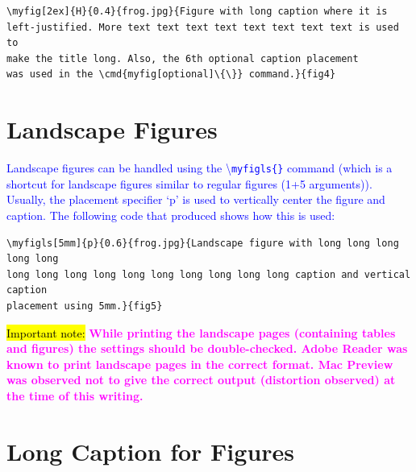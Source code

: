 \documentclass[phd,showframe]{ndsu-thesis-2022}
\newcommand\italk[1]{\textcolor{blue}{#1}}  %
\newcommand\cmd[1]{\textbackslash\texttt{#1}}  %
\begin{document}
{\singlespacing
\begin{verbatim}
\myfig[2ex]{H}{0.4}{frog.jpg}{Figure with long caption where it is 
left-justified. More text text text text text text text text is used to 
make the title long. Also, the 6th optional caption placement 
was used in the \cmd{myfig[optional]\{\}} command.}{fig4}
\end{verbatim}
}



\section{Landscape Figures}

\italk{Landscape figures can be handled using the \cmd{myfigls\{\}} command (which is a shortcut for landscape figures similar to regular figures (1+5 arguments)). Usually, the placement specifier `p' is used to vertically center the figure and caption. The following code that produced \Cref{fig5} shows how this is used:}

\vspace{-4ex}
{\singlespace
\begin{verbatim}
\myfigls[5mm]{p}{0.6}{frog.jpg}{Landscape figure with long long long long long
long long long long long long long long long long caption and vertical caption
placement using 5mm.}{fig5}
\end{verbatim}
}

\italk{\hl{Important note:}} \textcolor{magenta}{\bfseries While printing the landscape pages (containing tables and figures) the settings should be double-checked. Adobe Reader was known to print landscape pages in the correct format. Mac Preview was observed not to give the correct output (distortion observed) at the time of this writing.}

\kant[4]



\mysectop
\section{Long Caption for Figures}
\end{document}
